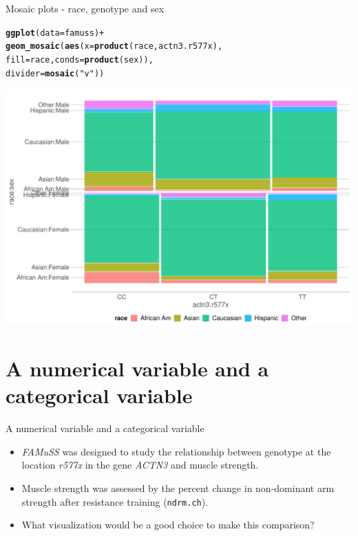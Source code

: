 \documentclass[10pt]{beamer}\usepackage[]{graphicx}\usepackage[]{color}
\makeatletter
\def\maxwidth{ %
  \ifdim\Gin@nat@width>\linewidth
    \linewidth
  \else
    \Gin@nat@width
  \fi
}
\newcommand{\hlstr}[1]{\textcolor[rgb]{0.192,0.494,0.8}{#1}}%
\newcommand{\hlopt}[1]{\textcolor[rgb]{0,0,0}{#1}}%
\newcommand{\hlstd}[1]{\textcolor[rgb]{0.345,0.345,0.345}{#1}}%
\newcommand{\hlkwc}[1]{\textcolor[rgb]{0.333,0.667,0.333}{#1}}%
\newcommand{\hlkwd}[1]{\textcolor[rgb]{0.737,0.353,0.396}{\textbf{#1}}}%
\newenvironment{kframe}{%
 \def\at@end@of@kframe{}%
 \ifinner\ifhmode%
  \def\at@end@of@kframe{\end{minipage}}%
  \begin{minipage}{\columnwidth}%
 \fi\fi%
 \def\FrameCommand##1{\hskip\@totalleftmargin \hskip-\fboxsep
 \colorbox{shadecolor}{##1}\hskip-\fboxsep
     \hskip-\linewidth \hskip-\@totalleftmargin \hskip\columnwidth}%
 \MakeFramed {\advance\hsize-\width
   \@totalleftmargin\z@ \linewidth\hsize
   \@setminipage}}%
 {\par\unskip\endMakeFramed%
 \at@end@of@kframe}
\newenvironment{knitrout}{}{} %
\makeatother
\begin{document}
\begin{frame}[fragile]{Mosaic plots - race, genotype and sex}
\begin{knitrout}\tiny
{}\color{fgcolor}\begin{kframe}
\begin{alltt}
    \hlkwd{ggplot}\hlstd{(}\hlkwc{data} \hlstd{= famuss)} \hlopt{+}
      \hlkwd{geom_mosaic}\hlstd{(}\hlkwd{aes}\hlstd{(}\hlkwc{x} \hlstd{=} \hlkwd{product}\hlstd{(race, actn3.r577x),}
                      \hlkwc{fill} \hlstd{= race,} \hlkwc{conds} \hlstd{=} \hlkwd{product}\hlstd{(sex)),}
                      \hlkwc{divider} \hlstd{=} \hlkwd{mosaic}\hlstd{(}\hlstr{"v"}\hlstd{))}
\end{alltt}
\end{kframe}

{\centering \includegraphics[width=\maxwidth]{figure/mosaic-2-1} 

}


\end{knitrout}
	
\end{frame}



\section{A numerical variable and a categorical variable}

\begin{frame}{A numerical variable and a categorical variable}
	\protect\hypertarget{a-numerical-variable-and-a-categorical-variable}{}
	
	\begin{itemize}
		\item \emph{FAMuSS} was designed to study the relationship between genotype at
	the location \emph{r577x} in the gene \emph{ACTN3} and muscle strength.
	
	\item Muscle strength was assessed by the percent change in non-dominant arm
	strength after resistance training (\texttt{ndrm.ch}).
	
	\item What visualization would be a good choice to make this comparison?
	\end{itemize}
	
\end{frame}
\end{document}
